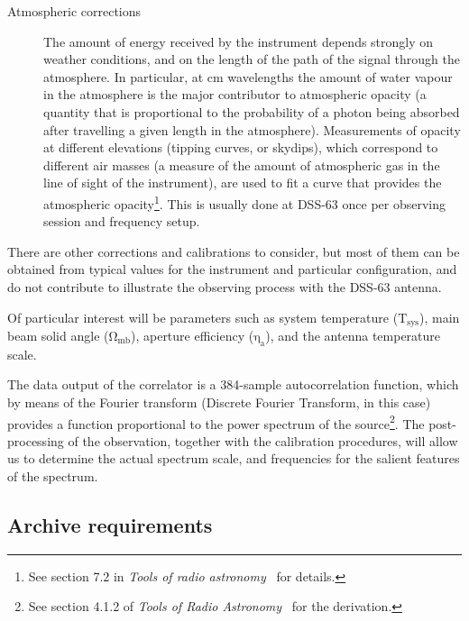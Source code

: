 \begin{description}
				\item[Atmospheric corrections] The amount of energy
				received by the instrument depends strongly on
				weather conditions, and on the length of the path
				of the signal through the atmosphere. In
				particular, at cm wavelengths the amount of water
				vapour in the atmosphere is the major contributor
				to atmospheric opacity (a quantity that is
				proportional to the probability of a photon being
				absorbed after travelling a given length in the
				atmosphere). Measurements of opacity at different
				elevations (tipping curves, or skydips), which
				correspond to different air masses (a measure of
				the amount of atmospheric gas in the line of sight
				of the instrument), are used to fit a curve that
				provides the atmospheric opacity\footnote{See
				section 7.2 in \emph{Tools of radio
				astronomy}~\cite{2004tra..book.....R} for
				details.}. This is usually
				done at DSS-63 once per observing session and
				frequency setup.
			\end{description}
			
			There are other corrections and calibrations to
			consider, but most of them can be obtained from typical
			values for the instrument and particular configuration,
			and do not contribute to illustrate the observing
			process with the DSS-63 antenna.
			
			 Of particular interest will be parameters such as
			system temperature ($\mathrm{T_{sys}}$), main beam
			solid angle ($\mathrm{\Omega_{mb}}$), aperture
			efficiency ($\mathrm{\eta_a}$), and the antenna
			temperature scale.
			
			 The data output of the correlator is a 384-sample
			autocorrelation function, which by means of the Fourier
			transform (Discrete Fourier Transform, in this case)
			provides a function proportional to the power spectrum
			of the source\footnote{See section 4.1.2 of \emph{Tools
			of Radio Astronomy}~\cite{2004tra..book.....R} for the
			derivation.}. The post-processing of the observation,
			together with the calibration procedures, will allow us
			to determine the actual spectrum scale, and frequencies
			for the salient features of the spectrum.
			
		
		\subsection{Archive requirements} %
		\label{sub:archive_requirements_dss63}
			
